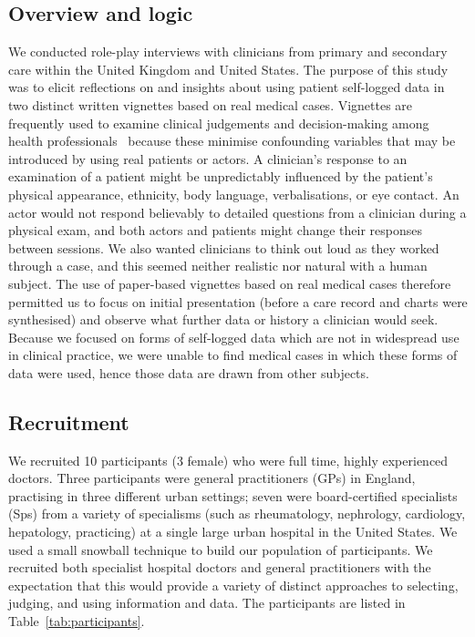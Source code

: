 \documentclass{sigchi}
\begin{document}
\subsection{Overview and logic}
We conducted role-play interviews with clinicians from primary and secondary care within the United Kingdom and United States. The purpose of this study was to elicit reflections on and insights about using patient self-logged data in two distinct written vignettes based on real medical cases.  Vignettes are frequently used to examine clinical judgements and decision-making among health professionals~\cite{evans2015vignette,redelmeier1995probability} because these minimise confounding variables that may be introduced by using real patients or actors. A clinician's response to an examination of a patient might be unpredictably influenced by the patient’s physical appearance, ethnicity, body language, verbalisations, or eye contact. An actor would not respond believably to detailed questions from a clinician during a physical exam, and both actors and patients might change their responses between sessions. We also wanted clinicians to think out loud as they worked through a case, and this seemed neither realistic nor natural with a human subject.  The use of paper-based vignettes based on real medical cases therefore permitted us to focus on initial presentation (before a care record and charts were synthesised) and observe what further data or history a clinician would seek. Because we focused on forms of self-logged data which are not in widespread use in clinical practice, we were unable to find medical cases in which these forms of data were used, hence those data are drawn from other subjects. 


\subsection{Recruitment}
We recruited 10 participants (3 female) who were full time, highly experienced doctors.  Three participants were general practitioners (GPs) in England, practising in three different urban settings; seven were board-certified specialists (Sps) from a variety of specialisms (such as rheumatology, nephrology, cardiology, hepatology, practicing) at a single large urban hospital in the United States.  We used a small snowball technique to build our population of participants.   We recruited both specialist hospital doctors and general practitioners with the expectation that this would provide a variety of distinct approaches to selecting, judging, and using information and data.  The participants are listed in Table~\ref{tab:participants}.
\end{document}
